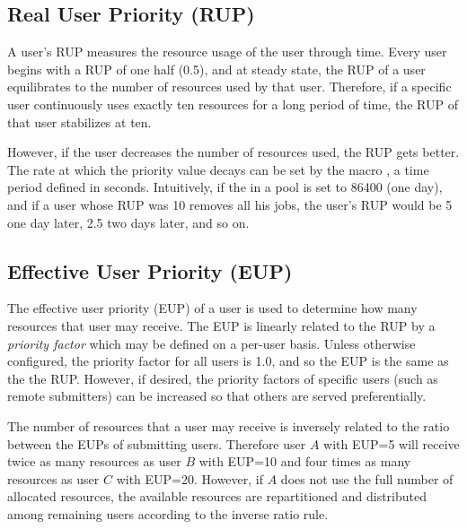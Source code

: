 \subsection{\label{sec:RUP}Real User Priority (RUP)}
A user's RUP measures the resource usage of the user 
through time.
Every user begins with a RUP of one half (0.5), and
at steady state, the RUP of a user equilibrates to the number of resources 
used by that user.  Therefore, if a specific user continuously uses exactly 
ten resources for a long period of time, the RUP of that user stabilizes at 
ten.

However, if the user decreases the number of resources used, the RUP
gets better.  The rate at which the priority value decays 
can be set by the macro , a time period 
defined in seconds.   Intuitively, if the  in a pool 
is set to 86400 (one day), and if a user whose RUP was 10 removes all his 
jobs, the user's RUP would be 5 one day later, 2.5 two days later,
and so on.

\subsection{\label{sec:EUP}Effective User Priority (EUP)}
The effective user priority (EUP) of a user is used to determine
how many resources that user may receive.
The EUP is linearly related to the RUP
by a \emph{priority factor} which may be defined on a per-user basis.
Unless otherwise configured, the priority factor for all users is 1.0,
and so the EUP is the same as the the RUP.
However, if desired, the priority factors of
specific users (such as remote submitters) can be increased so that 
others are served preferentially.

The number of resources that a user may receive is inversely related
to the ratio between the EUPs of submitting users.
Therefore user $A$ with EUP=5 will receive
twice as many resources as user $B$ with EUP=10 and four times as many 
resources as user $C$ with EUP=20.
However, if $A$ does not use the full number
of allocated resources,
the available resources are repartitioned and distributed among
remaining users according to the inverse ratio rule.

